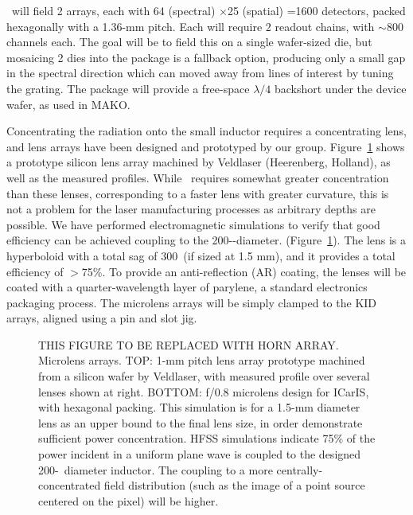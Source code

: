 \icaris\ will field 2 arrays, each with 64 (spectral) $\times$25 (spatial) =1600 detectors, packed hexagonally with a 1.36-mm pitch.  Each will require 2 readout chains, with $\sim$800 channels each.  The goal will be to field this on a single wafer-sized die, but mosaicing 2 dies into the package is a fallback option, producing only a small gap in the spectral direction which can moved away from lines of interest by tuning the grating.  The package will provide a free-space $\lambda/4$ backshort under the device wafer, as used in MAKO.

\vspace{0.05in}{\bf Silicon microlens array.}  Concentrating the radiation onto the small inductor requires a concentrating lens, and lens arrays have been designed and prototyped by our group.   Figure~\ref{fig:lenses} shows a prototype silicon lens array machined by Veldlaser (Heerenberg, Holland), as well as the measured profiles.   While \icaris\ requires somewhat greater concentration than these lenses, corresponding to a faster lens with greater curvature, this is not a problem for the laser manufacturing processes as arbitrary depths are possible.  We have performed electromagnetic simulations to verify that good efficiency can be achieved coupling to the 200-\mum-diameter. (Figure~\ref{fig:lenses}).   The lens is a hyperboloid with a total sag of 300~\mum (if sized at 1.5 mm), and it provides a total efficiency of $>$75\%.  To provide an anti-reflection (AR) coating, the lenses will be coated with a quarter-wavelength layer of parylene, a standard electronics packaging process.  The microlens arrays 
will be simply clamped to the KID arrays, aligned using a pin and slot jig.

\begin{figure}[t!]
\begin{center}
\captionbaseline\caption{\small THIS FIGURE TO BE REPLACED WITH HORN ARRAY.  Microlens arrays. TOP: 1-mm pitch lens array prototype machined from a silicon wafer by Veldlaser, with measured profile over several lenses shown at right.  BOTTOM:  f/0.8 microlens design for ICarIS, with hexagonal packing.  This simulation is for a 1.5-mm diameter lens as an upper bound to the final lens size, in order demonstrate sufficient power concentration.  HFSS simulations indicate 75\% of the power incident in a uniform plane wave is coupled to the designed 200-\mum\ diameter inductor.  The coupling to a more centrally-concentrated field distribution (such as the image of a point source centered on the pixel) will be higher. }
\linefig\vspace{-0.35in} \label{fig:lenses}
\end{center}
\end{figure}


